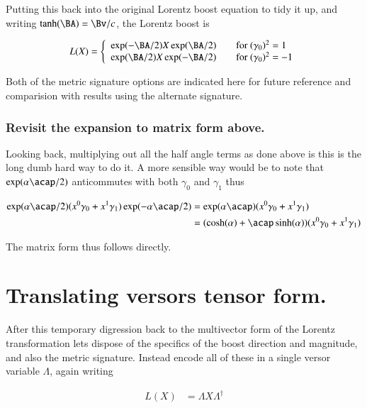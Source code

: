 \documentclass{article}
\begin{document}
Putting this back into the original Lorentz boost equation to tidy it up, and 
writing $\tanh(\BA) = \Bv/c$, the Lorentz boost is 

\begin{align*}
L(X) &= 
\left\{
\begin{array}{l l}
\exp(-\BA/2) X \exp(\BA/2) & \quad \mbox{for $(\gamma_0)^2 = 1$} \\
\exp(\BA/2) X \exp(-\BA/2) & \quad \mbox{for $(\gamma_0)^2 = -1$} \\
\end{array} \right. \\
\end{align*}

Both of the metric signature options are indicated here for future reference and comparision with results using the alternate signature.

\subsubsection{ Revisit the expansion to matrix form above. }

Looking back, multiplying out all the half angle terms as done above is this is the long dumb hard way to do it.
A more sensible way would be to note that $\exp(\alpha\acap/2)$ anticommutes with both $\gamma_0$ and $\gamma_1$ thus

\begin{align*}
\exp( \alpha \acap/2 ) (x^0\gamma_0 + x^1\gamma_1) \exp( -\alpha \acap/2 )
&= \exp( \alpha \acap ) (x^0\gamma_0 + x^1\gamma_1) \\
&= (\cosh( \alpha ) + \acap \sinh(\alpha)) (x^0\gamma_0 + x^1\gamma_1) \\
\end{align*}

The matrix form thus follows directly.

\section{ Translating versors tensor form. }

After this temporary digression back to the multivector form of the Lorentz transformation lets dispose of the specifics of the boost direction and magnitude, and also the metric
signature.  Instead encode all of these in a single versor variable $\Lambda$, again writing

\begin{align}
L(X) &= \Lambda X \Lambda^\dagger
\end{align}
\end{document}
